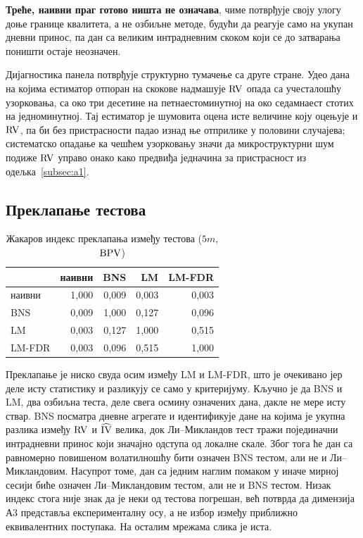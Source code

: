 \textbf{Треће, наивни праг готово ништа не означава}, чиме потврђује своју улогу доње
границе квалитета, а не озбиљне методе, будући да реагује само на укупан дневни принос,
па дан са великим интрадневним скоком који се до затварања поништи остаје неозначен.

Дијагностика панела потврђује структурно тумачење са друге стране. Удео дана на којима
естиматор отпоран на скокове надмашује $\mathrm{RV}$ опада са учесталошћу узорковања, са око
три десетине на петнаестоминутној на око седамнаест стотих на једноминутној. Тај естиматор
је шумовита оцена исте величине коју оцењује и $\mathrm{RV}$, па би без пристрасности падао
изнад ње отприлике у половини случајева; систематско опадање ка чешћем узорковању значи да
микроструктурни шум подиже $\mathrm{RV}$ управо онако како предвиђа једначина за пристрасност
из одељка~\ref{subsec:a1}.

\subsection{Преклапање тестова}

\begin{table}[htbp]
\centering
\caption{Жакаров индекс преклапања између тестова ($5m$, $\mathrm{BPV}$)}
\label{tab:zakar}
\begin{tabular}{lrrrr}
\toprule
        & наивни & BNS & LM & LM-FDR \\
\midrule
наивни  & 1,000 & 0,009 & 0,003 & 0,003 \\
BNS     & 0,009 & 1,000 & 0,127 & 0,096 \\
LM      & 0,003 & 0,127 & 1,000 & 0,515 \\
LM-FDR  & 0,003 & 0,096 & 0,515 & 1,000 \\
\bottomrule
\end{tabular}
\end{table}

Преклапање је ниско свуда осим између LM и LM-FDR, што је очекивано јер деле исту
статистику и разликују се само у критеријуму. Кључно је да BNS и LM, два озбиљна теста,
деле свега осмину означених дана, дакле не мере исту ствар. BNS посматра дневне агрегате и идентификује дане на
којима је укупна разлика између $\mathrm{RV}$ и $\widehat{\mathrm{IV}}$ велика, док Ли–Микландов тест тражи
појединачни интрадневни принос који значајно одступа од локалне скале. Због тога ће дан
са равномерно повишеном волатилношћу бити означен BNS тестом, али не и Ли–Микландовим.
Насупрот томе, дан са једним наглим помаком у иначе мирној сесији биће означен
Ли–Микландовим тестом, али не и BNS тестом. Низак индекс стога није знак да је
неки од тестова погрешан, већ потврда да димензија А3 представља експерименталну осу, а
не избор између приближно еквивалентних поступака. На осталим мрежама слика је иста.

